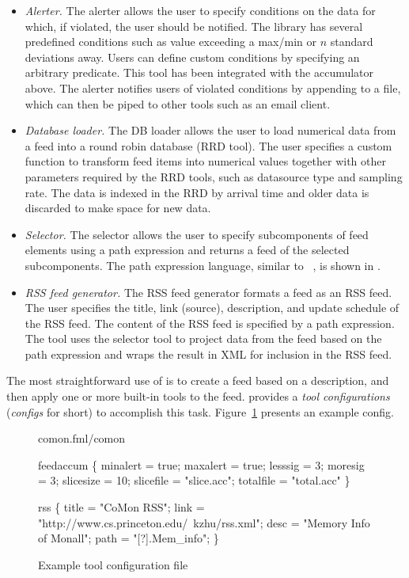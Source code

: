 \begin{itemize}
\item {\em Alerter.} The alerter allows the user to specify conditions on the data for which, if violated, the user should be notified. The library has several predefined conditions such as value exceeding a max/min or  $n$ standard deviations away. 
Users can define custom conditions by specifying an arbitrary \ocaml{} predicate. 
This tool has been integrated with the accumulator above. The alerter notifies users of violated conditions by
appending to a file, which can then be piped to other tools such as an email
client.

\item {\em Database loader.} The DB loader allows the user to load numerical
data from a feed into a round robin database (RRD tool). The user specifies
a custom function to transform feed items into numerical values together with other parameters required by the RRD tools, such as datasource
type and sampling rate. The data is indexed in the RRD by arrival time and
older data is discarded to make space for new data.

\item {\em Selector.} The selector allows the user to specify subcomponents of feed elements using a path expression and returns a feed of the selected subcomponents. The path expression language, similar to \xpath{}~\cite{xpath}, is shown in .

\item {\em RSS feed generator.} The RSS feed generator formats a
\padsd{} feed as an RSS feed. The user specifies
the title, link (source), description, and update schedule of the RSS feed.
The content of the RSS feed is specified by a path expression. The tool uses the selector tool to
project data from the feed based on the path expression and wraps the result in XML for inclusion in the RSS feed.
\end{itemize}

The most straightforward use of \padsd{} is to create a feed 
based on a \padsd{} description, and then apply one or more built-in tools 
to the feed. \padsd{} provides a {\it tool configurations} ({\it configs} for short) to accomplish this task. 
Figure~\ref{fig:toolconfigs} presents an example config.

\begin{figure}[tb]
\centering
\begin{codebox}
 comon.fml/comon

 feedaccum
\{
  minalert  = true;
  maxalert  = true;
  lesssig   = 3;
  moresig   = 3;
  slicesize = 10;
  slicefile = "slice.acc";
  totalfile = "total.acc"
\}

 rss
\{
  title = "CoMon RSS";
  link  = "http://www.cs.princeton.edu/~kzhu/rss.xml";
  desc  = "Memory Info of Monall";
  path  = "[?].Mem_info";
\}
\end{codebox}
\caption{Example tool configuration file}
\label{fig:toolconfigs}
\end{figure}

